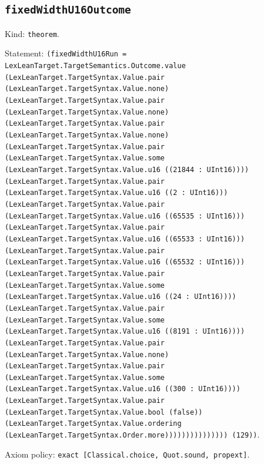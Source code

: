 \documentclass[11pt]{article}
\begin{document}
\subsection*{\texttt{fixedWidthU16Outcome}}
\noindent Kind: \texttt{theorem}.\par
\noindent Statement: \texttt{(fixedWidthU16Run = LexLeanTarget.TargetSemantics.Outcome.value (LexLeanTarget.TargetSyntax.Value.pair (LexLeanTarget.TargetSyntax.Value.none) (LexLeanTarget.TargetSyntax.Value.pair (LexLeanTarget.TargetSyntax.Value.none) (LexLeanTarget.TargetSyntax.Value.pair (LexLeanTarget.TargetSyntax.Value.none) (LexLeanTarget.TargetSyntax.Value.pair (LexLeanTarget.TargetSyntax.Value.some (LexLeanTarget.TargetSyntax.Value.u16 ((21844 : UInt16)))) (LexLeanTarget.TargetSyntax.Value.pair (LexLeanTarget.TargetSyntax.Value.u16 ((2 : UInt16))) (LexLeanTarget.TargetSyntax.Value.pair (LexLeanTarget.TargetSyntax.Value.u16 ((65535 : UInt16))) (LexLeanTarget.TargetSyntax.Value.pair (LexLeanTarget.TargetSyntax.Value.u16 ((65533 : UInt16))) (LexLeanTarget.TargetSyntax.Value.pair (LexLeanTarget.TargetSyntax.Value.u16 ((65532 : UInt16))) (LexLeanTarget.TargetSyntax.Value.pair (LexLeanTarget.TargetSyntax.Value.some (LexLeanTarget.TargetSyntax.Value.u16 ((24 : UInt16)))) (LexLeanTarget.TargetSyntax.Value.pair (LexLeanTarget.TargetSyntax.Value.some (LexLeanTarget.TargetSyntax.Value.u16 ((8191 : UInt16)))) (LexLeanTarget.TargetSyntax.Value.pair (LexLeanTarget.TargetSyntax.Value.none) (LexLeanTarget.TargetSyntax.Value.pair (LexLeanTarget.TargetSyntax.Value.some (LexLeanTarget.TargetSyntax.Value.u16 ((300 : UInt16)))) (LexLeanTarget.TargetSyntax.Value.pair (LexLeanTarget.TargetSyntax.Value.bool (false)) (LexLeanTarget.TargetSyntax.Value.ordering (LexLeanTarget.TargetSyntax.Order.more))))))))))))))) (129))}.\par
\noindent Axiom policy: \texttt{exact [Classical.choice, Quot.sound, propext]}.\par
\end{document}
